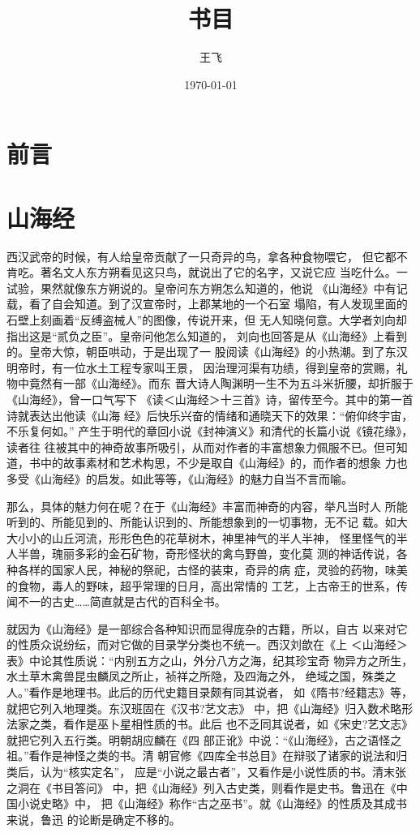 \documentclass[a4paper,12pt,UTF8,twoside]{ctexbook}
\title{\heiti\zihao{0} 书目}
\author{王飞}
\date{\today}
\begin{document}
\maketitle
\tableofcontents

\frontmatter
\chapter{前言}


\mainmatter

\chapter{山海经}

西汉武帝的时候，有人给皇帝贡献了一只奇异的鸟，拿各种食物喂它， 但它都不肯吃。著名文人东方朔看见这只鸟，就说出了它的名字，又说它应 当吃什么。一试验，果然就像东方朔说的。皇帝问东方朔怎么知道的，他说 《山海经》中有记载，看了自会知道。到了汉宣帝时，上郡某地的一个石室 塌陷，有人发现里面的石壁上刻画着“反缚盗械人”的图像，传说开来，但 无人知晓何意。大学者刘向却指出这是“贰负之臣”。皇帝问他怎么知道的， 刘向也回答是从《山海经》上看到的。皇帝大惊，朝臣哄动，于是出现了一 股阅读《山海经》的小热潮。到了东汉明帝时，有一位水土工程专家叫王景， 因治理河渠有功绩，得到皇帝的赏赐，礼物中竟然有一部《山海经》。而东 晋大诗人陶渊明一生不为五斗米折腰，却折服于《山海经》，曾一口气写下 《读＜山海经＞十三首》诗，留传至今。其中的第一首诗就表达出他读《山海 经》后快乐兴奋的情绪和通晓天下的效果：“俯仰终宇宙，不乐复何如。” 产生于明代的章回小说《封神演义》和清代的长篇小说《镜花缘》，读者往 往被其中的神奇故事所吸引，从而对作者的丰富想象力佩服不已。但可知 道，书中的故事素材和艺术构思，不少是取自《山海经》的，而作者的想象 力也多受《山海经》的启发。如此等等，《山海经》的魅力自当不言而喻。

那么，具体的魅力何在呢？在于《山海经》丰富而神奇的内容，举凡当时人 所能听到的、所能见到的、所能认识到的、所能想象到的一切事物，无不记 载。如大大小小的山丘河流，形形色色的花草树木，神里神气的半人半神， 怪里怪气的半人半兽，瑰丽多彩的金石矿物，奇形怪状的禽鸟野兽，变化莫 测的神话传说，各种各样的国家人民，神秘的祭祀，古怪的装束，奇异的病 症，灵验的药物，味美的食物，毒人的野味，超乎常理的日月，高出常情的 工艺，上古帝王的世系，传闻不一的古史……简直就是古代的百科全书。

就因为《山海经》是一部综合各种知识而显得庞杂的古籍，所以，自古 以来对它的性质众说纷纭，而对它做的目录学分类也不统一。西汉刘歆在《上 ＜山海经＞表》中论其性质说：“内别五方之山，外分八方之海，纪其珍宝奇 物异方之所生，水土草木禽兽昆虫麟凤之所止，祯祥之所隐，及四海之外， 绝域之国，殊类之人。”看作是地理书。此后的历代史籍目录颇有同其说者， 如《隋书?经籍志》等，就把它列入地理类。东汉班固在《汉书?艺文志》 中，把《山海经》归入数术略形法家之类，看作是巫卜星相性质的书。此后 也不乏同其说者，如《宋史?艺文志》就把它列入五行类。明朝胡应麟在《四 部正讹》中说：“《山海经》，古之语怪之祖。”看作是神怪之类的书。清 朝官修《四库全书总目》在辩驳了诸家的说法和归类后，认为“核实定名”， 应是“小说之最古者”，又看作是小说性质的书。清末张之洞在《书目答问》 中，把《山海经》列入古史类，则看作是史书。鲁迅在《中国小说史略》中， 把《山海经》称作“古之巫书”。就《山海经》的性质及其成书来说，鲁迅 的论断是确定不移的。
\end{document}
